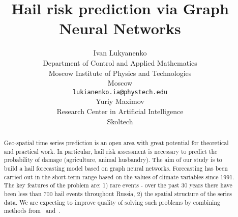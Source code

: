 \documentclass{article}
\title{Hail risk prediction via Graph Neural Networks}
\author{ Ivan Lukyanenko \\
	Department of Control and Applied Mathematics\\
	Moscow Institute of Physics and Technologies\\
	Moscow \\
	\texttt{lukianenko.ia@phystech.edu} \\
	\And
	Yuriy Maximov \\
	Research Center in Artificial Intelligence\\
	Skoltech\\
}
\date{}
\begin{document}
\maketitle

\begin{abstract}
	Geo-spatial time series prediction is an open area with great potential for theoretical and practical work. In particular, hail risk assessment is necessary to predict the probability of damage (agriculture, animal husbandry). The aim of our study is to build a hail forecasting model based on graph neural networks. Forecasting has been carried out in the short-term range based on the values ​​of climate variables since 1991. The key features of the problem are: 1) rare events - over the past 30 years there have been less than 700 hail events throughout Russia, 2) the spatial structure of the series data. We are expecting to improve quality of solving such problems by combining methods from~\cite{DBLP:journals/corr/abs-2012-01598} and~\cite{DBLP:journals/corr/abs-2005-07427}.
\end{abstract}






\end{document}
